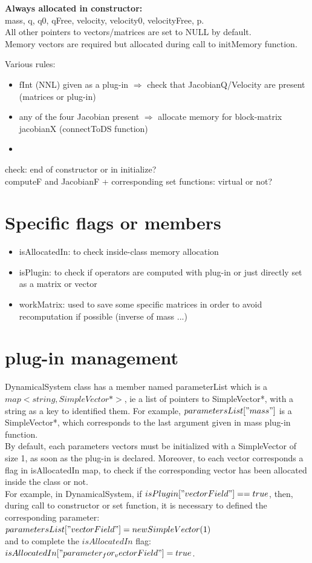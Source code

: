 \documentclass[10pt]{report}
\begin{document}
\textbf{Always allocated in constructor:} \\
mass, q, q0, qFree, velocity, velocity0, velocityFree, p. \\
All other pointers to vectors/matrices are set to NULL by default. \\
Memory vectors are required but allocated during call to initMemory function. 

Various rules:
\begin{itemize}
\item fInt (NNL) given as a plug-in $\Rightarrow$ check that JacobianQ/Velocity are present (matrices or plug-in)
\item any of the four Jacobian present $\Rightarrow$ allocate memory for block-matrix jacobianX  (connectToDS function)
\item 
\end{itemize}

check: end of constructor or in initialize? \\
computeF and JacobianF + corresponding set functions: virtual or not? \\


\section{Specific flags or members}

\begin{itemize}
\item isAllocatedIn: to check inside-class memory allocation
\item isPlugin: to check if operators are computed with plug-in or just directly set as a matrix or vector
\item workMatrix: used to save some specific matrices in order to avoid recomputation if possible (inverse of mass ...)
\end{itemize}

\section{plug-in management}
DynamicalSystem class has a member named parameterList which is a $map<string, SimpleVector*>$, ie a list of
pointers to SimpleVector*, with a string as a key to identified them. 
For example, $parametersList["mass"]$ is a SimpleVector*, which corresponds to the last argument given in 
mass plug-in function. \\
By default, each parameters vectors must be initialized with a SimpleVector of size 1, as soon as the plug-in is
declared. Moreover, to each vector corresponds a flag in isAllocatedIn map, to check if the corresponding vector has been 
allocated inside the class or not. \\ 
For example, in DynamicalSystem, if $isPlugin["vectorField"]==true$, then, during call to constructor or set function,
it is necessary to defined the corresponding parameter: \\
$parametersList["vectorField"] = new SimpleVector(1)$ \\
and to complete the $isAllocatedIn$ flag: \\
$isAllocatedIn["parameter_for_vectorField"] = true$. \\
\end{document}
